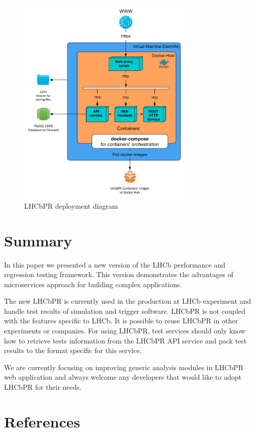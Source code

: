 \documentclass[10pt]{iopart}
\begin{document}
\begin{figure}[H]
\begin{minipage}{\textwidth}
\includegraphics[width=0.75\textwidth]{figs/lhcbpr-nodes.pdf}
\caption{\label{fig:nodes}LHCbPR deployment diagram}
\end{minipage}
\end{figure}

\section{Summary}
In this paper we presented a new version of the LHCb performance and regression
testing framework. This version demonstrates the advantages of microservices
approach for building complex applications.

The new LHCbPR is currently used in the production at LHCb experiment and handle
test results of simulation and trigger software. LHCbPR is not coupled with the
features specific to LHCb. It is possible to reuse LHCbPR in other experiments
or companies. For using LHCbPR, test services should only know how to retrieve
tests information from the LHCbPR API service and pack test results to the
format specific for this service.

We are currently focusing on improving generic analysis modules in LHCbPR web
application and always welcome any developers that would like to adopt LHCbPR
for their needs.


\section*{References}

\end{document}
